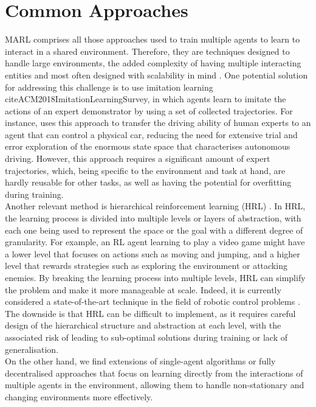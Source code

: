 \documentclass[a4paper,singleside,12pt]{report} %
\begin{document}
\section{Common Approaches}\label{common-approaches}
MARL comprises all those approaches used to train multiple agents to learn to interact in a shared environment. Therefore, they are techniques designed to handle large environments, the added complexity of having multiple interacting entities and most often designed with scalability in mind \cite{Gronauer2021MultiagentDR, HernandezLeal2019ASA, Stone2022ASO}. One potential solution for addressing this challenge is to use imitation learning cite{ACM2018ImitationLearningSurvey}, in which agents learn to imitate the actions of an expert demonstrator by using a set of collected trajectories. For instance, \cite{Osinski2019SimulationBasedRL, Maramotti2022TacklingRA} uses this approach to transfer the driving ability of human experts to an agent that can control a physical car, reducing the need for extensive trial and error exploration of the enormous state space that characterises autonomous driving. However, this approach requires a significant amount of expert trajectories, which, being specific to the environment and task at hand, are hardly reusable for other tasks, as well as having the potential for overfitting during training.\\
Another relevant method is hierarchical reinforcement learning (HRL) \cite{MLKE2022HRLSurvey}. In HRL, the learning process is divided into multiple levels or layers of abstraction, with each one being used to represent the space or the goal with a different degree of granularity. For example, an RL agent learning to play a video game might have a lower level that focuses on actions such as moving and jumping, and a higher level that rewards strategies such as exploring the environment or attacking enemies. By breaking the learning process into multiple levels, HRL can simplify the problem and make it more manageable at scale. Indeed, it is currently considered a state-of-the-art technique in the field of robotic control problems \cite{Nachum2018DataEfficientHR}. The downside is that HRL can be difficult to implement, as it requires careful design of the hierarchical structure and abstraction at each level, with the associated risk of leading to sub-optimal solutions during training or lack of generalisation.\\
On the other hand, we find extensions of single-agent algorithms or fully decentralised approaches that focus on learning directly from the interactions of multiple agents in the environment, allowing them to handle non-stationary and changing environments more effectively.
\end{document}

